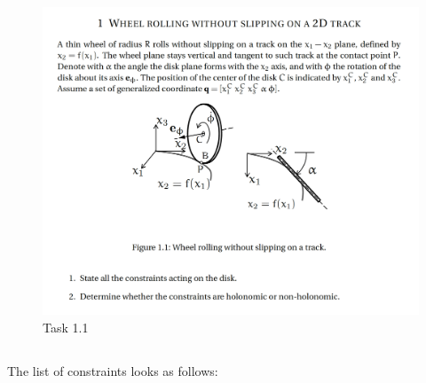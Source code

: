 \begin{figure}[ht]
    \centering
    \includegraphics[scale=0.4]{images/1.1.png}
    \caption{Task 1.1}
    \label{fig:task1.1}
\end{figure}
\clearpage

\subsection{}
\subsubsection{}\label{subsubsec:1.1.1}
The list of constraints looks as follows:

